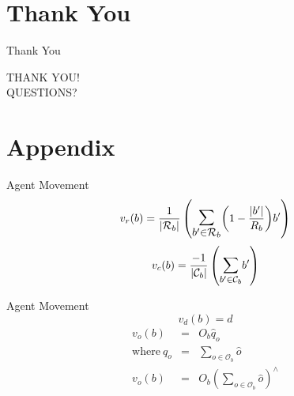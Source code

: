\documentclass{beamer}
\newcommand{\card}[1]{\vert{#1}\vert}
\newcommand{\magn}[1]{\vert{#1}\vert}
\begin{document}
\section*{Thank You}

\begin{frame}{Thank You}
  \begin{center}
  THANK YOU!\\
  QUESTIONS?
  \end{center}
\end{frame}

\section*{Appendix}

\begin{frame}{Agent Movement}
  \begin{equation}\label{eq:Repulsion1}
    v_r(b) = 
    \frac{1}{\card{\mathcal R_b}}
    \left(
      \mathlarger{\mathlarger{\sum_{b' \in \mathcal R_b}}}
      {\left( 1-\frac{\magn{b'}}{R_b} \right)}
      b'
    \right)
    \end{equation}
    \begin{equation}\label{eq:FlyToCentre1}
      v_c(b) =
      \frac{-1}{\card{\mathcal C_b}}\left({\mathlarger{\sum_{b' \in
      \mathcal C_b}}{b'}}\right)
    \end{equation}
\end{frame}

\begin{frame}{Agent Movement}
    \begin{equation}\label{eq:Direction}
      v_d(b) = d
    \end{equation}
    \begin{eqnarray}\label{eq:Obstacle2}
      v_o(b) & = & O_b \hat q_o \\
      \mathrm{where~}  q_o & = & \sum_{o\in \mathcal O_b } \hat o
      \nonumber \\
      v_o(b) & = & O_b \left(\sum_{o\in \mathcal O_b }\hat o\right)^{\!\!\wedge} \nonumber
    \end{eqnarray}
\end{frame}
\end{document}

